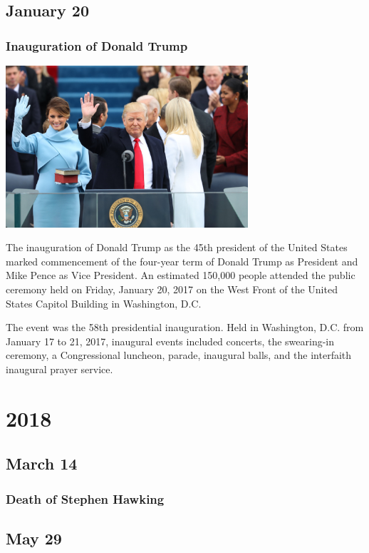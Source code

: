 \documentclass[11pt]{report}
\begin{document}
\section{January 20}
\subsection{Inauguration of Donald Trump}
\vspace{2mm}\begin{center}\includegraphics[width=9cm]{./img/trumpInaug.jpg}\end{center}
The inauguration of Donald Trump as the 45th president of the United States marked commencement of the four-year term of Donald Trump as President and Mike Pence as Vice President. An estimated 150,000 people attended the public ceremony held on Friday, January 20, 2017 on the West Front of the United States Capitol Building in Washington, D.C.

The event was the 58th presidential inauguration. Held in Washington, D.C. from January 17 to 21, 2017, inaugural events included concerts, the swearing-in ceremony, a Congressional luncheon, parade, inaugural balls, and the interfaith inaugural prayer service.

\chapter{2018}
\section{March 14}
\subsection{Death of Stephen Hawking}

\section{May 29}
\end{document}
